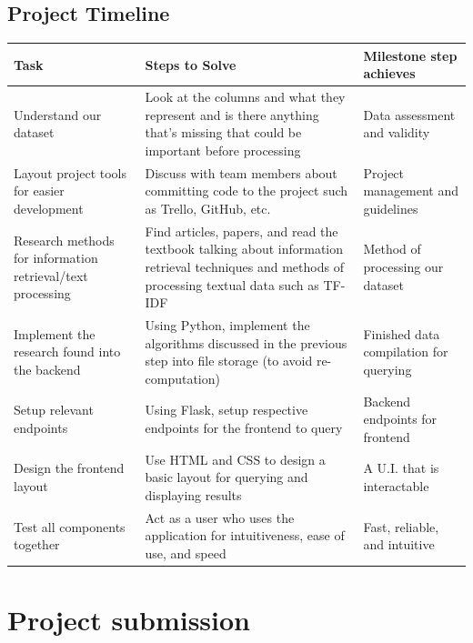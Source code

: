 \documentclass{article}
\begin{document}
\subsection{Project Timeline}
\begin{center}
    \begin{tabular}{|m{5cm}|m{5cm}|m{5cm}|}
    \hline
    Task & Steps to Solve & Milestone step achieves     \\ \hline
    Understand our dataset & Look at the columns and what they represent and is there anything that’s missing that could be important before processing    & Data assessment and validity               \\ \hline
    Layout project tools for easier development       & Discuss with team members about committing code to the project such as Trello, GitHub, etc.     & Project management and guidelines               \\ \hline
    Research methods for information retrieval/text processing      & Find articles, papers, and read the textbook talking about information retrieval techniques and methods of processing textual data such as TF-IDF    & Method of processing our dataset    \\ \hline
    Implement the research found into the backend      & Using Python, implement the algorithms discussed in the previous step into file storage (to avoid re-computation)  & Finished data compilation for querying  \\ \hline
    Setup relevant endpoints      & Using Flask, setup respective endpoints for the frontend to query & Backend endpoints for frontend \\ \hline
    Design the frontend layout  & Use HTML and CSS to design a basic layout for querying and displaying results & A U.I. that is interactable \\ \hline
    Test all components together     & Act as a user who uses the application for intuitiveness, ease of use, and speed       & Fast, reliable, and intuitive       \\ \hline
    \end{tabular}
\end{center}

\section{Project submission}
\end{document}
